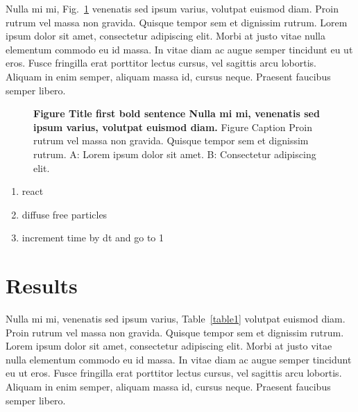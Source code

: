 \documentclass[10pt,letterpaper]{article}
\begin{document}
Nulla mi mi, Fig.~\ref{fig1} venenatis sed ipsum varius, volutpat euismod diam. Proin rutrum vel massa non gravida. Quisque tempor sem et dignissim rutrum. Lorem ipsum dolor sit amet, consectetur adipiscing elit. Morbi at justo vitae nulla elementum commodo eu id massa. In vitae diam ac augue semper tincidunt eu ut eros. Fusce fringilla erat porttitor lectus cursus,  vel sagittis arcu lobortis. Aliquam in enim semper, aliquam massa id, cursus neque. Praesent faucibus semper libero.

\begin{figure}[h]
\caption{{\bf Figure Title first bold sentence Nulla mi mi, venenatis sed ipsum varius, volutpat euismod diam.}
Figure Caption Proin rutrum vel massa non gravida. Quisque tempor sem et dignissim rutrum. A: Lorem ipsum dolor sit amet. B: Consectetur adipiscing elit.}
\label{fig1}
\end{figure}

\begin{enumerate}
\item{react}
\item{diffuse free particles}
\item{increment time by dt and go to 1}
\end{enumerate}

\section*{Results}
Nulla mi mi, venenatis sed ipsum varius, Table~\ref{table1} volutpat euismod diam. Proin rutrum vel massa non gravida. Quisque tempor sem et dignissim rutrum. Lorem ipsum dolor sit amet, consectetur adipiscing elit. Morbi at justo vitae nulla elementum commodo eu id massa. In vitae diam ac augue semper tincidunt eu ut eros. Fusce fringilla erat porttitor lectus cursus, vel sagittis arcu lobortis. Aliquam in enim semper, aliquam massa id, cursus neque. Praesent faucibus semper libero.
\end{document}
